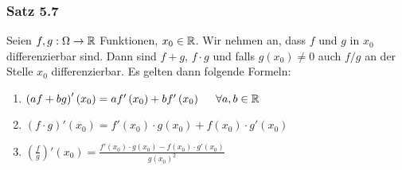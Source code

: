 \subsubsection*{Satz 5.7}
Seien $f,g:\Omega\to\mathbb{R}$ Funktionen, $x_0\in\mathbb{R}$. Wir nehmen an, dass $f$ und $g$ in $x_0$ differenzierbar sind. Dann sind $f+g$, $f\cdot g$ und falls $g\left( x_0\right)\not=0$ auch $f/g$ an der Stelle $x_0$ differenzierbar. Es gelten dann folgende Formeln:
\begin{enumerate}
\item $\left( {af + bg} \right)'\left( {{x_0}} \right) = af'\left( {{x_0}} \right) + bf'\left( {{x_0}} \right)\hspace{5mm}\forall a,b \in \mathbb{R}$
\item \label{satz5.7,2.}$\left( {f \cdot g} \right)'\left( {{x_0}} \right) = f'\left( {{x_0}} \right) \cdot g\left( {{x_0}} \right) + f\left( {{x_0}} \right) \cdot g'\left( {{x_0}} \right)$
\item $\left( {\frac{f}{g}} \right)'\left( {{x_0}} \right) = \frac{{f'\left( {{x_0}} \right) \cdot g\left( {{x_0}} \right) - f\left( {{x_0}} \right) \cdot g'\left( {{x_0}} \right)}}{{g{{\left( {{x_0}} \right)}^2}}}$
\end{enumerate}
